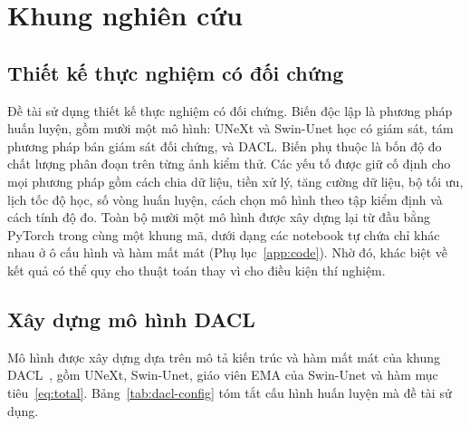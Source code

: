 \section{Khung nghiên cứu}

\subsection{Thiết kế thực nghiệm có đối chứng}

Đề tài sử dụng thiết kế thực nghiệm có đối chứng. Biến độc lập là phương pháp huấn luyện, gồm mười một mô hình: UNeXt và Swin-Unet học có giám sát, tám phương pháp bán giám sát đối chứng, và DACL. Biến phụ thuộc là bốn độ đo chất lượng phân đoạn trên từng ảnh kiểm thử. Các yếu tố được giữ cố định cho mọi phương pháp gồm cách chia dữ liệu, tiền xử lý, tăng cường dữ liệu, bộ tối ưu, lịch tốc độ học, số vòng huấn luyện, cách chọn mô hình theo tập kiểm định và cách tính độ đo. Toàn bộ mười một mô hình được xây dựng lại từ đầu bằng PyTorch trong cùng một khung mã, dưới dạng các notebook tự chứa chỉ khác nhau ở ô cấu hình và hàm mất mát (Phụ lục~\ref{app:code}). Nhờ đó, khác biệt về kết quả có thể quy cho thuật toán thay vì cho điều kiện thí nghiệm.

\subsection{Xây dựng mô hình DACL}
\label{sec:dacl-impl}

Mô hình được xây dựng dựa trên mô tả kiến trúc và hàm mất mát của khung DACL~\cite{wang2026dacl}, gồm UNeXt, Swin-Unet, giáo viên EMA của Swin-Unet và hàm mục tiêu~\eqref{eq:total}. Bảng~\ref{tab:dacl-config} tóm tắt cấu hình huấn luyện mà đề tài sử dụng.

